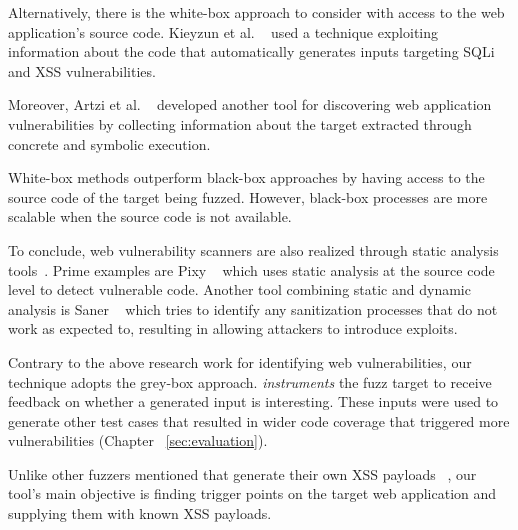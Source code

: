 Alternatively, there is the white-box approach to consider with access to the web application's source code. Kieyzun et al. ~\cite{kieyzun2009automatic} used a technique exploiting information about the code that automatically generates inputs targeting SQLi and XSS vulnerabilities. 

Moreover, Artzi et al. ~\cite{artzi2010finding} developed another tool for discovering web
application vulnerabilities by collecting information about the target extracted through concrete and symbolic execution.

White-box methods outperform black-box approaches by having access to the source code of the target being fuzzed. However, black-box processes are more scalable when the source code is not 
available. 

To conclude, web vulnerability scanners are also realized through static analysis tools~\cite{balzarotti2008saner,jovanovic2006pixy,jovanovic2006precise,medeiros2014mining,medeiros2016dekant}. Prime examples are Pixy ~\cite{jovanovic2006pixy} which uses static analysis at the source code
level to detect vulnerable code. Another tool combining static and dynamic analysis is Saner ~\cite{balzarotti2008saner} which tries to identify any sanitization processes that do not work as expected to, resulting in allowing attackers to introduce exploits.

Contrary to the above research work for identifying web vulnerabilities, our technique adopts the
grey-box approach. \pname{} \emph{instruments} the fuzz target to receive feedback on whether a generated input is interesting. These inputs were used to generate other test cases that resulted in wider code coverage that triggered more vulnerabilities (Chapter ~\ref{sec:evaluation}). 

Unlike other fuzzers mentioned that generate their own XSS payloads ~\cite{duchene2014kameleonfuzz}, our tool's  main objective is finding trigger points on the target web application and supplying them with known XSS payloads. 